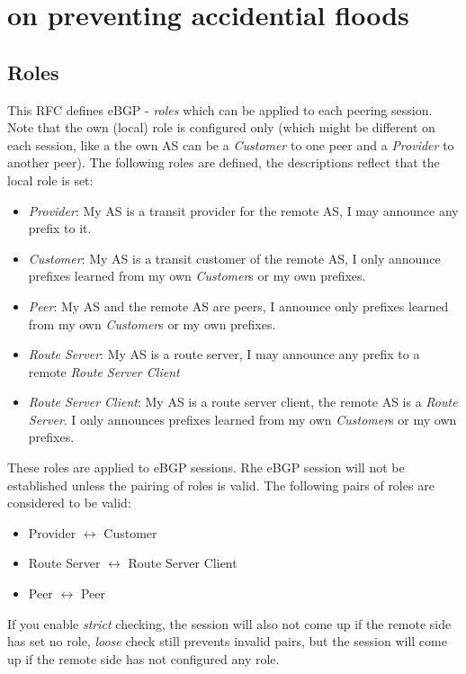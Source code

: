 \section{ on preventing accidential floods}
\subsection{Roles}
This RFC defines eBGP - \emph{roles} which can be applied to each peering session. 
Note that the own (local) role is configured only (which might be different on each session, like a the own AS can be a \emph{Customer} to one peer and a \emph{Provider} to another peer).
The following roles are defined, the descriptions reflect that the local role is set:
\begin{itemize}
  \item \emph{Provider}: My AS is a transit provider for the remote AS, I may announce any prefix to it.
  \item \emph{Customer}: My AS is a transit customer of the remote AS, I only announce  prefixes learned from my own \emph{Customer}s or my own prefixes.
  \item \emph{Peer}: My AS and the remote AS are peers, I announce only  prefixes learned from my own \emph{Customer}s or my own prefixes.
  \item \emph{Route Server}: My AS is a route server, I may announce any prefix to a remote \emph{Route Server Client}
  \item \emph{Route Server Client}: My AS is a route server client, the remote AS is a \emph{Route Server}. I only announces  prefixes learned from my own \emph{Customer}s or my own prefixes.
\end{itemize}

These roles are applied to eBGP sessions.  Rhe eBGP session will not be established unless the pairing of roles is valid. The following pairs of roles are considered to be valid:
\begin{itemize}
  \item Provider $\longleftrightarrow$ Customer
  \item Route Server $\longleftrightarrow$ Route Server Client
  \item Peer $\longleftrightarrow$ Peer
\end{itemize}

If you enable \emph{strict} checking, the session will also not come up if the remote side has set no role, \emph{loose} check still prevents invalid pairs, but the session will come up if the remote side has not configured any role.

